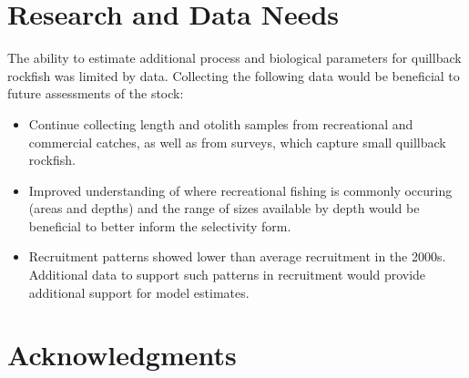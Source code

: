 \documentclass[11pt,
  english,
  a4paper,
]{article}
\begin{document}
\leavevmode\tagmcend\tagstructend\par


\hypertarget{research-and-data-needs}{%
\section{Research and Data Needs}\label{research-and-data-needs}}

\leavevmode\tagmcend\tagstructend


The ability to estimate additional process and biological parameters for quillback rockfish was limited by data. Collecting the following data would be beneficial to future assessments of the stock:

\leavevmode\tagmcend\tagstructend\par

\begin{itemize}

    \item Continue collecting length and otolith samples from recreational and commercial catches, as well as from surveys, which capture small quillback rockfish.

    \item Improved understanding of where recreational fishing is commonly occuring (areas and depths) and the range of sizes available by depth would be beneficial to better inform the selectivity form.  
    
    \item Recruitment patterns showed lower than average recruitment in the 2000s. Additional data to support such patterns in recruitment would provide additional support for model estimates.  
    
\end{itemize}


\hypertarget{acknowledgments}{%
\section{Acknowledgments}\label{acknowledgments}}

\leavevmode\tagmcend\tagstructend

\end{document}
